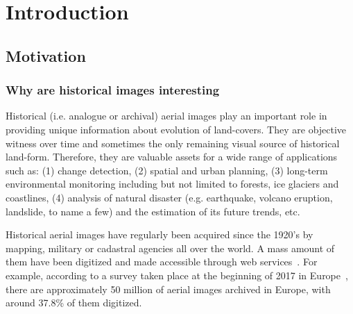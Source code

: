 
\chapter{Introduction}
\label{chap:intro}
\minitoc

\section{Motivation}
\subsection{Why are historical images interesting}
Historical (i.e. analogue or archival) aerial images play an important role in providing unique information about evolution of land-covers. 
They are objective witness over time and sometimes the only remaining visual source of historical land-form. Therefore, they are valuable assets for a wide range of applications such as: (1) change detection, (2) spatial and urban planning, (3) long-term environmental monitoring including but not limited to forests, ice glaciers and coastlines, (4) analysis of natural disaster (e.g. earthquake, volcano eruption, landslide, to name a few) and the estimation of its future trends, etc.
\par
Historical aerial images have regularly been acquired since the 1920’s by mapping, military or cadastral agencies all over the world. A mass amount of them have been digitized and made accessible through web services~\cite{sebastien2019archiving,earthexplorer,remonterletemps}. 
For example, according to a survey taken place at the beginning of 2017 in Europe~\cite{sebastien2019archiving}, there are approximately 50 million of aerial images archived in Europe, with around 37.8\% of them digitized.
